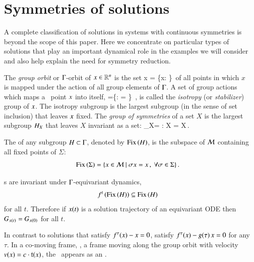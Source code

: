 
\section{\label{s:symSol} Symmetries of solutions}

A complete classification of solutions in systems with
continuous symmetries is beyond the scope of this paper. Here
we concentrate on particular types of solutions that play an
important dynamical role in the examples we will consider and
also help explain the need for symmetry reduction.

The \emph{group orbit} or $\Gamma$-orbit of
$x\in\mathbb{R}^{n}$ is the set
\beq
	\Group x = \{\LieEl x: \LieEl\in\Group\}\,
\eeq
of all points in which $x$ is mapped under the action of all
group elements of $\Gamma$.
A set of group actions which maps a \statesp\ point $x$ into itself,
\beq
\stab{\ssp} =\{\LieEl \in \Group: \LieEl \ssp = \ssp \}
    \,,
is called the \emph{isotropy} (or \emph{stabilizer})  group of $\ssp$.
The isotropy subgroup is the largest subgroup (in the
sense of set inclusion) that leaves $\ssp$ fixed.
The \emph{group of symmetries} of a set $X$ is the largest
subgroup $\Subgroup_X$ that leaves $X$ invariant as a set:
\beq
	\Group_X= {\LieEl: \LieEl X = X}\,.
\eeq

The \emph{\fixedsp} of any subgroup $H\subset\Gamma$,
denoted by $\mathrm{Fix}\left(H\right)$, is the subspace of $\mathcal{M}$
containing all fixed points of $\Sigma$:
\[
	\mathrm{Fix}\left(\Sigma\right)=\{x\in\mathcal{M}\ |\ \sigma x = x\,,\ \forall \sigma\in\Sigma\}\,.
\]

\Fixedsp s are invariant under $\Gamma$-equivariant dynamics,
\[
 f^t\left(\mathrm{Fix}\left(H\right)\right)\subseteq \mathrm{Fix}\left(H\right)
\] for all
$t$. Therefore if $x(t)$ is a solution trajectory of an
equivariant ODE then $G_{x(t)}=G_{x(0)}$ for all $t$.


In contrast to \emph{\eqv} solutions that satisfy
$f^\tau(x) - x = 0$, \emph{\reqva} satisfy
$f^\tau(x) - g( \tau) \, x= 0$ for any $\tau$. In
a co-moving frame, \ie, a frame moving along the group orbit
with velocity $v(x) = c \cdot \mathfrak{t}(x)$,
the \reqv\ appears as an \eqv.

